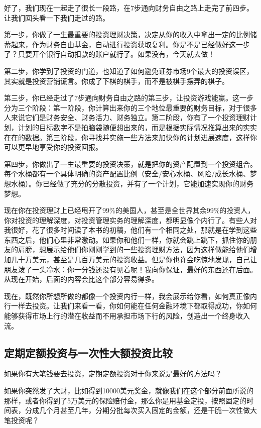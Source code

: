 好了，我们现在一起走了很长一段路，在7步通向财务自由之路上走完了前四步。让我们回头看一下我们走过的路。

第一步，你做了一生最重要的投资理财决策，决定从你的收入中拿出一定的比例储蓄起来，作为财务自由基金，自动进行投资获取复利。你是不是已经做好这一步了？只要开个银行自动扣款的账户就行了。如果没有，今天就去做！

第二步，你学到了投资的门道，也知道了如何避免证券市场9个最大的投资误区，其实就是投资营销谎言。你成了下棋的棋手，而不是被棋手摆弄的棋子。

第三步，你已经走过了7步通向财务自由之路的第三步，让投资游戏能赢。这一步分为三个阶段：第一阶段，你计算出来你的三个地位最重要的财务目标，对于很多人来说它们是财务安全、财务活力、财务独立。第二阶段，你有了一个投资理财计划，计划的目标数字不是拍脑袋随便想出来的，而是根据实际情况推算出来的实实在在的数据。第三阶段，你寻找并实施一些方法来加快你的计划进展速度，这样你可以更早地享受你的投资回报。

第四步，你做出了一生最重要的投资决策，就是把你的资产配置到一个投资组合。每个水桶都有一个具体明确的资产配置比例（安全/安心水桶、风险/成长水桶、梦想水桶）。你已经做了充分的分散投资，并有了一个计划，它能加速实现你的财务梦想。

现在你在投资理财上已经甩开了99\%的美国人，甚至是全世界其余99\%的投资人，你对投资的理解深度，对投资管理实务的理解深度，都明显像个内行了。有些人对我很好，花了很多时间读了本书的初稿，他们有一个相同之处，那就是在学到这些东西之后，他们心里非常激动。如果你和他们一样，你就会跳上跳下，抓住你的朋友的肩膀，想展示给他们你刚刚学到的一些投资理财方法，因为这样做能给他们增加几十万美元，甚至是几百万美元的投资收益。但是你也许会吃惊地发现，自己让朋友泼了一头冷水：你一分钱还没有见着呢！我向你保证，最好的东西还在后面。从现在开始，后面的内容会比这个部分容易得多。

现在，既然你所想所做的都像一个投资内行一样，我会展示给你看，如何真正像内行一样去投资。让我们来看一看，你如何能在任何金融环境下都取得成功，你如何能够获得市场上行的潜在收益而不用承担市场下行的风险，创造出一个终身收入流。

\subsection{定期定额投资与一次性大额投资比较}

如果你有大笔钱要去投资，定期定额投资对于你来说是最好的方法吗？

如果你突然发了大财，比如得到10000美元奖金，就像我们在这个部分前面所说的那样，或者你得到了5万美元的保险赔付金，那么你是用基金定投，按照固定的时间表，分成几个月甚至几年，分期分批每次买入固定的金额，还是干脆一次性做大笔投资呢？

